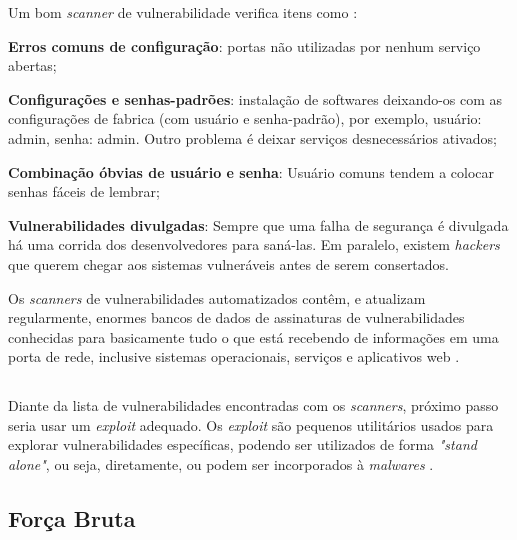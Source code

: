 Um bom \textit{scanner} de vulnerabilidade verifica itens como \cite{univhacker}: 

\begin{alineas}
\item \textbf{Erros comuns de configuração}: portas não utilizadas por nenhum serviço abertas;
\item \textbf{Configurações e senhas-padrões}: instalação de softwares deixando-os com as configurações de fabrica (com usuário e senha-padrão), por exemplo, usuário: admin, senha: admin. Outro problema é deixar serviços desnecessários ativados;
\item \textbf{Combinação óbvias de usuário e senha}: Usuário comuns tendem a colocar senhas fáceis de lembrar;
\item \textbf{Vulnerabilidades divulgadas}: Sempre que uma falha de segurança é divulgada há uma corrida dos desenvolvedores para saná-las. Em paralelo, existem \textit{hackers} que querem chegar aos sistemas vulneráveis antes de serem consertados.
\end{alineas}

Os \textit{scanners} de vulnerabilidades automatizados contêm, e atualizam regularmente, enormes bancos de dados de assinaturas de vulnerabilidades conhecidas para basicamente tudo o que está recebendo de informações em uma porta de rede, inclusive sistemas operacionais, serviços e aplicativos web \cite{hackers:stuart-joel}. 


\subsection{} \label{sec:exploit}

Diante da lista de vulnerabilidades encontradas com os \textit{scanners}, próximo passo seria usar um \textit{exploit} adequado. Os \textit{exploit} são pequenos utilitários usados para explorar vulnerabilidades específicas, podendo ser utilizados de forma \textit{"stand alone"}, ou seja, diretamente, ou podem ser incorporados à \textit{malwares} \cite{exploit:cassio}.

\subsection{Força Bruta} \label{sec:forçabruta}

